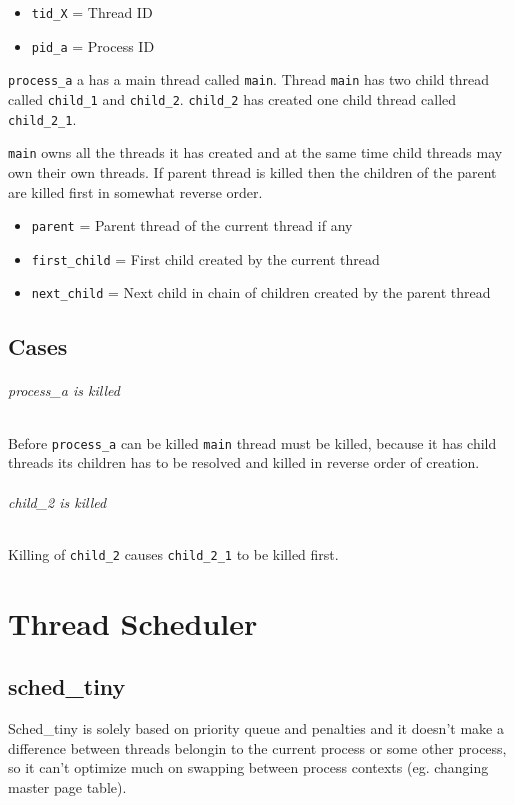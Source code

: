 \begin{itemize}
  \item \verb+tid_X+ = Thread ID
  \item \verb+pid_a+ = Process ID
\end{itemize}

\verb+process_a+ a has a main thread called \verb+main+. Thread
\verb+main+ has two child thread called \verb+child_1+ and \verb+child_2+.
\verb+child_2+ has created one child thread called \verb+child_2_1+.

\verb+main+ owns all the threads it has created and at the same time child
threads may own their own threads. If parent thread is killed then the
children of the parent are killed first in somewhat reverse order.

\begin{itemize}
  \item \verb+parent+ = Parent thread of the current thread if any
  \item \verb+first_child+ = First child created by the current thread
  \item \verb+next_child+ = Next child in chain of children created by the
        parent thread
\end{itemize}

\section{Cases}
\subparagraph*{process\_a is killed}

Before \verb+process_a+ can be killed \verb+main+ thread must be killed,
because it has child threads its children has to be resolved and killed in
reverse order of creation.

\subparagraph*{child\_2 is killed}

Killing of \verb+child_2+ causes \verb+child_2_1+ to be killed first.


\chapter{Thread Scheduler}

\section{sched\_tiny}

Sched\_tiny is solely based on priority queue and penalties and it doesn't make
a difference between threads belongin to the current process or some other
process, so it can't optimize much on swapping between process contexts
(eg. changing master page table).

